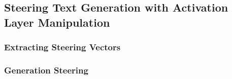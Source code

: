 \subsection{Steering Text Generation with Activation Layer Manipulation}

\subsubsection{Extracting Steering Vectors}

\subsubsection{Generation Steering}